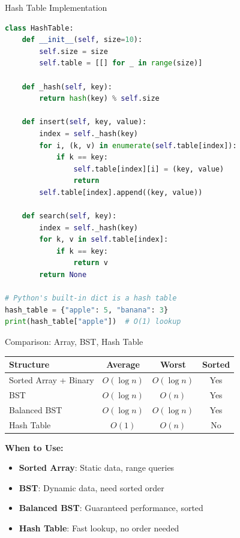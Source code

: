 \documentclass[aspectratio=169]{beamer}
\begin{document}
\begin{frame}[fragile]{Hash Table Implementation}
\begin{lstlisting}[language=Python, basicstyle=\ttfamily\tiny]
class HashTable:
    def __init__(self, size=10):
        self.size = size
        self.table = [[] for _ in range(size)]

    def _hash(self, key):
        return hash(key) % self.size

    def insert(self, key, value):
        index = self._hash(key)
        for i, (k, v) in enumerate(self.table[index]):
            if k == key:
                self.table[index][i] = (key, value)
                return
        self.table[index].append((key, value))

    def search(self, key):
        index = self._hash(key)
        for k, v in self.table[index]:
            if k == key:
                return v
        return None

# Python's built-in dict is a hash table
hash_table = {"apple": 5, "banana": 3}
print(hash_table["apple"])  # O(1) lookup
\end{lstlisting}
\end{frame}

\begin{frame}{Comparison: Array, BST, Hash Table}
  \begin{center}
  \begin{tabular}{|l|c|c|c|}
    \hline
    \textbf{Structure} & \textbf{Average} & \textbf{Worst} & \textbf{Sorted} \\
    \hline
    Sorted Array + Binary & $O(\log n)$ & $O(\log n)$ & Yes \\
    \hline
    BST & $O(\log n)$ & $O(n)$ & Yes \\
    \hline
    Balanced BST & $O(\log n)$ & $O(\log n)$ & Yes \\
    \hline
    Hash Table & $O(1)$ & $O(n)$ & No \\
    \hline
  \end{tabular}
  \end{center}

  \vspace{0.3cm}
  \textbf{When to Use:}
  \begin{itemize}
    \item \textbf{Sorted Array}: Static data, range queries
    \item \textbf{BST}: Dynamic data, need sorted order
    \item \textbf{Balanced BST}: Guaranteed performance, sorted
    \item \textbf{Hash Table}: Fast lookup, no order needed
  \end{itemize}
\end{frame}
\end{document}
